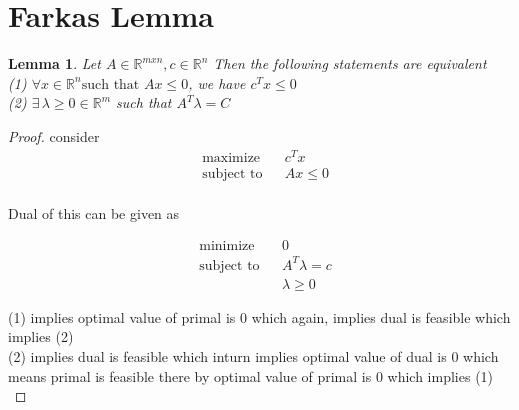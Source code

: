 \documentclass[twoside]{article}
\newtheorem{lemma}[theorem]{Lemma}
\DeclareMathOperator{\minimize}{minimize}
\DeclareMathOperator{\subjectto}{subject\ to}
\begin{document}
\section{Farkas Lemma}
\begin{lemma}
Let $A\in\mathbb{R}^{m x n}, c\in \mathbb{R}^{n}$ Then the following statements are equivalent \\
(1) $\forall x \in \mathbb{R}^{n} \text{such that }Ax \leq 0 $, we have $c^{T}x\leq 0 $\\
(2) $ \exists \, \lambda \geq 0 \in \mathbb{R}^{m}$ such that $A^{T}\lambda = C $ 
\end{lemma}
\begin{proof}
consider  
\begin{equation*}
\begin{aligned}
& \text{maximize} && c^{T}x\\
& \subjectto && Ax \leq 0\\
\end{aligned}
\end{equation*}

Dual of this can be given as 

\begin{equation*}
\begin{aligned}
& \minimize && 0\\
& \subjectto && A^T\lambda = c\\
&&& \lambda  \geq 0
\end{aligned}
\end{equation*}

(1) implies optimal value of primal is $0$ which again, implies dual is feasible which implies (2)\\
(2) implies dual is feasible which inturn implies optimal value of dual is 0 which means primal is feasible there by optimal value of primal is 0 which implies (1)\\
\end{proof}
\end{document}
